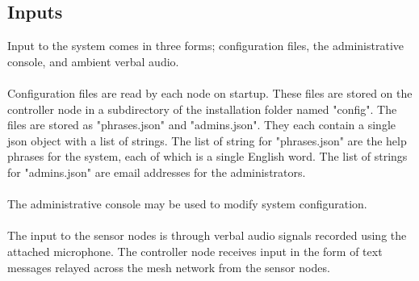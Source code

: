 \documentclass[11pt,a4paper]{article}
\begin{document}
\subsection{Inputs}
Input to the system comes in three forms; configuration files, the administrative console, and ambient verbal audio. \\\\
Configuration files are read by each node on startup. These files are stored on the controller node in a subdirectory of the installation folder named "config".  The files are stored as "phrases.json" and "admins.json". They each contain a single json object with a list of strings. The list of string for "phrases.json" are the help phrases for the system, each of which is a single English word. The list of strings for "admins.json" are email addresses for the administrators. \\\\
The administrative console may be used to modify system configuration. \\\\
The input to the sensor nodes is through verbal audio signals recorded using the attached microphone.  The controller node receives input in the form of text messages relayed across the mesh network from the sensor nodes.
\end{document}
